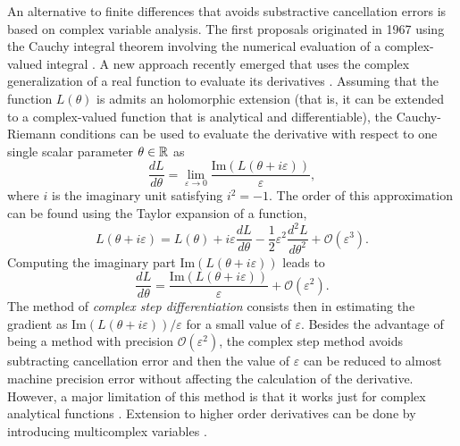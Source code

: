 An alternative to finite differences that avoids substractive cancellation errors is based on complex variable analysis. 
The first proposals originated in 1967 using the Cauchy integral theorem involving the numerical evaluation of a complex-valued integral \cite{Lyness_1967, Lyness_Moler_1967}.
A new approach recently emerged that uses the complex generalization of a real function to evaluate its derivatives \cite{Squire_Trapp_1998_complex_diff, Martins_Sturdza_Alonso_2003_complex_differentiation}. 
Assuming that the function $L(\theta)$ is admits an holomorphic extension (that is, it can be extended to a complex-valued function that is analytical and differentiable\cite{stein2010complex}), the Cauchy-Riemann conditions can be used to evaluate the derivative with respect to one single scalar parameter $\theta \in \operatorname{\mathbb{R}}$ as
\begin{equation}
    \frac{dL}{d\theta} = \lim_{\varepsilon \rightarrow 0} \frac{\text{Im}(L(\theta + i \varepsilon))}{\varepsilon},
\end{equation}
where $i$ is the imaginary unit satisfying $i^2 = -1$. 
The order of this approximation can be found using the Taylor expansion of a function,
\begin{equation}
    L(\theta + i \varepsilon)
    = 
    L(\theta) + i \varepsilon \frac{dL}{d\theta} 
    - 
    \frac 1 2  \varepsilon^2
    \frac{d^2 L}{d\theta^2}
    + 
    \mathcal O (\varepsilon^3).
\end{equation}
Computing the imaginary part $\text{Im}(L(\theta + i \varepsilon))$ leads to
\begin{equation}
    \frac{dL}{d\theta} 
    = 
    \frac{\text{Im}(L(\theta + i \varepsilon))}{\varepsilon}
    + 
    \mathcal{O} (\varepsilon^2).
\end{equation}
The method of \textit{complex step differentiation} consists then in estimating the gradient as $\text{Im}(L(\theta + i \varepsilon)) / \varepsilon$ for a small value of $\varepsilon$. 
Besides the advantage of being a method with precision $\mathcal{O}(\varepsilon^2)$, the complex step method avoids subtracting cancellation error and then the value of $\varepsilon$ can be reduced to almost machine precision error without affecting the calculation of the derivative. 
However, a major limitation of this method is that it works just for complex analytical functions \cite{Martins_Sturdza_Alonso_2003_complex_differentiation}.
Extension to higher order derivatives can be done by introducing multicomplex variables \cite{Lantoine_Russell_Dargent_2012}. 

